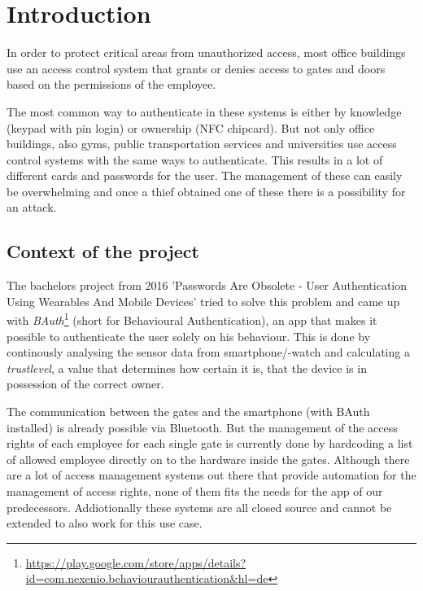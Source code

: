 \section{Introduction}

In order to protect critical areas from unauthorized access, most office buildings use an access control system that grants or denies access to gates and doors based on the permissions of the employee.

The most common way to authenticate in these systems is either by knowledge (keypad with pin login) or ownership (NFC chipcard).
But not only office buildings, also gyms, public transportation services and universities use access control systems with the same ways to authenticate. This results in a lot of different cards and passwords for the user. The management of these can easily be overwhelming and once a thief obtained one of these there is a possibility for an attack.

\subsection{Context of the project}
\label{Context of the project}

The bachelors project from 2016 'Passwords Are Obsolete - User Authentication Using Wearables And Mobile Devices' tried to solve this problem and came up with \emph{BAuth}\footnote{\url{https://play.google.com/store/apps/details?id=com.nexenio.behaviourauthentication&hl=de}} (short for Behavioural Authentication), an app that makes it possible to authenticate the user solely on his behaviour. This is done by continously analysing the sensor data from smartphone/-watch and calculating a \emph{trustlevel}, a value that determines how certain it is, that the device is in possession of the correct owner.

The communication between the gates and the smartphone (with BAuth installed) is already possible via Bluetooth. But the management of the access rights of each employee for each single gate is currently done by hardcoding a list of allowed employee directly on to the hardware inside the gates. Although there are a lot of access management systems out there that provide automation for the management of access rights, none of them fits the needs for the app of our predecessors. Addiotionally these systems are all closed source and cannot be extended to also work for this use case. 


